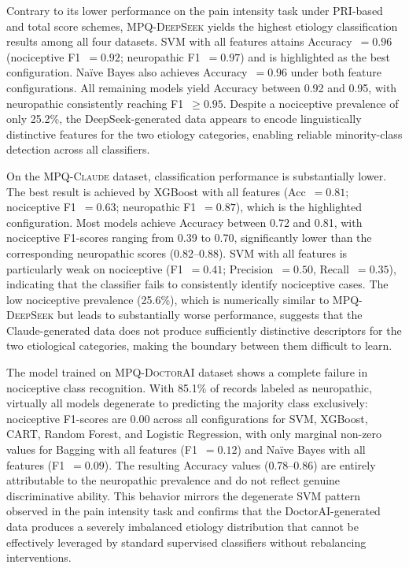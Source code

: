 \documentclass[preprint,12pt,authoryear]{elsarticle}
\newcommand{\dbClaude}{\small\textsc{MPQ-Claude}\xspace}
\newcommand{\dbDeepSeek}{\small\textsc{MPQ-DeepSeek}\xspace}
\newcommand{\dbDoctorAI}{\small\textsc{MPQ-DoctorAI}\xspace}
\begin{document}
Contrary to its lower performance on the pain intensity task under PRI-based and total score schemes, \dbDeepSeek yields the highest etiology classification results among all four datasets. SVM with all features attains Accuracy~$= 0.96$ (nociceptive F1~$= 0.92$; neuropathic F1~$= 0.97$) and is highlighted as the best configuration. Naïve Bayes also achieves Accuracy~$= 0.96$ under both feature configurations. All remaining models yield Accuracy between 0.92 and 0.95, with neuropathic consistently reaching F1~$\geq 0.95$. Despite a nociceptive prevalence of only 25.2\%, the DeepSeek-generated data appears to encode linguistically distinctive features for the two etiology categories, enabling reliable minority-class detection across all classifiers.

On the \dbClaude dataset, classification performance is substantially lower. The best result is achieved by XGBoost with all features (Acc~$= 0.81$; nociceptive F1~$= 0.63$; neuropathic F1~$= 0.87$), which is the highlighted configuration. Most models achieve Accuracy between 0.72 and 0.81, with nociceptive F1-scores ranging from 0.39 to 0.70, significantly lower than the corresponding neuropathic scores (0.82--0.88). SVM with all features is particularly weak on nociceptive (F1~$= 0.41$; Precision~$= 0.50$, Recall~$= 0.35$), indicating that the classifier fails to consistently identify nociceptive cases. The low nociceptive prevalence (25.6\%), which is numerically similar to \dbDeepSeek but leads to substantially worse performance, suggests that the Claude-generated data does not produce sufficiently distinctive descriptors for the two etiological categories, making the boundary between them difficult to learn.

The model trained on \dbDoctorAI dataset shows a complete failure in nociceptive class recognition. With 85.1\% of records labeled as neuropathic, virtually all models degenerate to predicting the majority class exclusively: nociceptive F1-scores are 0.00 across all configurations for SVM, XGBoost, CART, Random Forest, and Logistic Regression, with only marginal non-zero values for Bagging with all features (F1~$= 0.12$) and Naïve Bayes with all features (F1~$= 0.09$). The resulting Accuracy values (0.78--0.86) are entirely attributable to the neuropathic prevalence and do not reflect genuine discriminative ability. This behavior mirrors the degenerate SVM pattern observed in the pain intensity task and confirms that the DoctorAI-generated data produces a severely imbalanced etiology distribution that cannot be effectively leveraged by standard supervised classifiers without rebalancing interventions.
\end{document}
